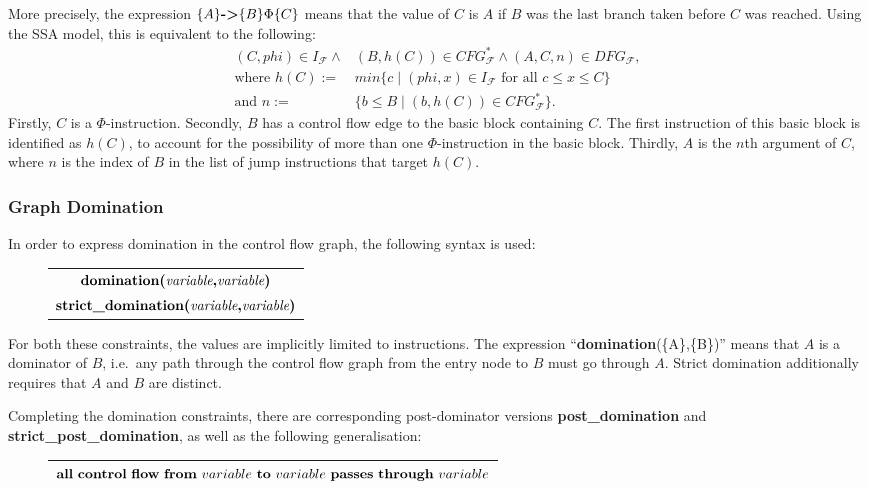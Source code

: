     \noindent
    More precisely, the expression $\{A\}\text{\bf ->}\{B\}\Phi\{C\}$ means that
    the value of $C$ is $A$ if $B$ was the last branch taken before $C$ was
    reached.
    Using the SSA model, this is equivalent to the following:
    \begin{align*}
        (C,phi)\in I_\mathcal F\mathrel\land{}&(B,h(C))\in CFG_\mathcal F^*\mathrel\land(A,C,n)\in DFG_\mathcal F,\\
            \text{where }h(C):={}&min\{c\mid (phi,x)\in I_\mathcal F\text{ for all }c\leq x\leq C\}\\
            \text{and }n:={}&\{b\leq B\mid (b,h(C))\in CFG_\mathcal F^*\}.
    \end{align*}
    Firstly, $C$ is a $\Phi$-instruction.
    Secondly, $B$ has a control flow edge to the basic block containing $C$.
    The first instruction of this basic block is identified as $h(C)$, to
    account for the possibility of more than one $\Phi$-instruction in the
    basic block.
    Thirdly, $A$ is the $n$th argument of $C$, where $n$ is the index of $B$ in
    the list of jump instructions that target $h(C)$.

\subsubsection{Graph Domination}

    In order to express domination in the control flow graph, the following
    syntax is used:
\begin{figure}[h]
    \centering
    \begin{tabular}{|c|}
        \hline
        $\text{\bf domination(}\text{\it variable}\text{\bf,} \text{\it variable}\text{\bf)}$\\
        $\text{\bf strict\_domination(}\text{\it variable}\text{\bf,} \text{\it variable}\text{\bf)}$\\
        \hline
    \end{tabular}
\end{figure}

    \noindent
    For both these constraints, the values are implicitly limited to
    instructions.
    The expression ``{\bf domination}(\{A\},\{B\})'' means that $A$ is a
    dominator of $B$, i.e.\ any path through the control flow graph from the
    entry node to $B$ must go through $A$.
    Strict domination additionally requires that $A$ and $B$ are distinct.

    Completing the domination constraints, there are corresponding
    post-dominator versions {\bf post\_domination} and
    {\bf strict\_post\_domination}, as well as the following generalisation:
\begin{figure}[h]
    \centering
    \begin{tabular}{|c|}
        \hline
        ${\bf all}\ {\bf control}\ {\bf flow}\ {\bf from}\ variable\ {\bf to}\ variable\ {\bf passes}\ {\bf through}\ variable$\\
        \hline
    \end{tabular}
\end{figure}


